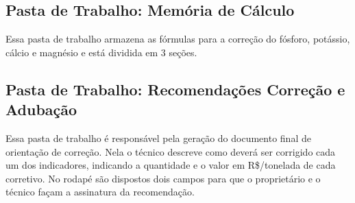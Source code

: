 \subsection{Pasta de Trabalho: Memória de Cálculo}
\label{subsec:memoriadecalculo}

Essa pasta de trabalho armazena as fórmulas para a correção do fósforo, potássio, cálcio e magnésio e está dividida em 3 seções.

\subsection{Pasta de Trabalho: Recomendações Correção e Adubação}
\label{subsec:recomendacoes}

Essa pasta de trabalho é responsável pela geração do documento final de orientação de correção. Nela o técnico descreve como deverá ser corrigido cada um dos indicadores, indicando a quantidade e o valor em R\$/tonelada de cada corretivo.
No rodapé são dispostos dois campos para que o proprietário e o técnico façam a assinatura da recomendação.
